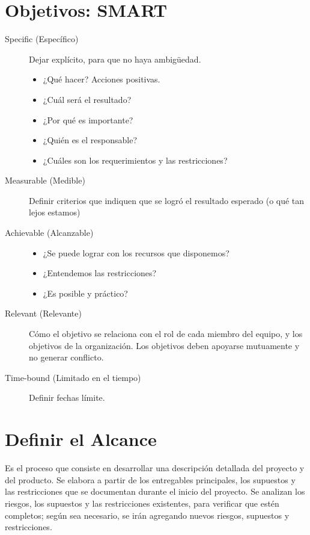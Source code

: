 \documentclass[portrait,a0paper,fontscale=0.277]{baposter}
\newcommand{\compresslist}{%
\setlength{\topsep}{0pt}%
\setlength{\itemsep}{0pt}%
\setlength{\parskip}{0pt}%
\setlength{\parsep}{0pt}%
}
\begin{document}
\begin{poster}
{\section*{Objetivos: SMART}
\begin{description}
	\item[Specific (Específico)] Dejar explícito, para que no haya ambigüedad.
		\begin{itemize}\compresslist
			\item ¿Qué hacer? Acciones positivas.
			\item ¿Cuál será el resultado?
			\item ¿Por qué es importante?
			\item ¿Quién es el responsable?
			\item ¿Cuáles son los requerimientos y las restricciones?
		\end{itemize}
	\item[Measurable (Medible)]
	Definir criterios que indiquen que se logró el resultado esperado (o qué tan lejos estamos)
\item[Achievable (Alcanzable)]\hfill
	\begin{itemize}\compresslist
		\item ¿Se puede lograr con los recursos que disponemos?
		\item ¿Entendemos las restricciones?
		\item ¿Es posible y práctico?
	\end{itemize}
\item[Relevant (Relevante)]
	Cómo el objetivo se relaciona con el rol de cada miembro del equipo, y los objetivos de la organización.
	Los objetivos deben apoyarse mutuamente y no generar conflicto.
\item[Time-bound (Limitado en el tiempo)]
	Definir fechas límite.

\end{description}
	
	
\section*{Definir el Alcance} Es el proceso que consiste en desarrollar una descripción detallada del
proyecto y del producto. Se elabora a partir de los entregables principales, los supuestos y
las restricciones que se documentan durante el inicio del proyecto. Se analizan los riesgos, los
supuestos y las restricciones existentes, para verificar que estén completos; según sea necesario,
se irán agregando nuevos riesgos, supuestos y restricciones. 

}
\end{poster}
\end{document}
